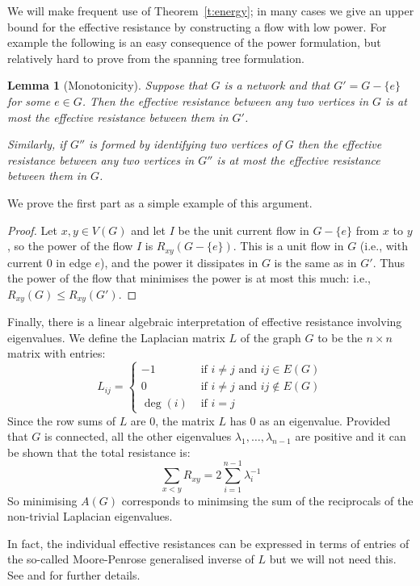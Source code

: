 \documentclass[11pt]{article}
\newtheorem{lemma}[theorem]{Lemma}
\theoremstyle{remark}
\begin{document}
We will make frequent use of Theorem~\ref{t:energy}; in many cases we
give an upper bound for the effective resistance by constructing a
flow with low power. For example the following is an easy consequence
of the power formulation, but relatively hard to prove from the
spanning tree formulation.

\begin{lemma}[Monotonicity]
  Suppose that $G$ is a network and that $G'=G-\{e\}$ for some $e\in
  G$. Then the effective resistance between any two vertices in $G$ is
  at most the effective resistance between them in $G'$.

  Similarly, if $G''$ is formed by identifying two vertices of $G$
  then the effective resistance between any two vertices in $G''$ is
  at most the effective resistance between them in $G$.
\end{lemma}
We prove the first part as a simple example of this argument.
\begin{proof}
  Let $x,y\in V(G)$ and let $I$ be the unit current flow in $G-\{e\}$
  from $x$ to $y$, so the power of the flow $I$ is $R_{xy}(G-\{e\})$.
  This is a unit flow in $G$ (i.e., with current 0 in edge $e$), and
  the power it dissipates in $G$ is the same as in $G'$. Thus the
  power of the flow that minimises the power is at most this much:
  i.e., $R_{xy}(G)\le R_{xy}(G')$.
\end{proof}

Finally, there is a linear algebraic interpretation of effective resistance involving eigenvalues. We define the Laplacian matrix $L$ of the graph $G$ to be the $n\times n$ matrix with entries:
\[
L_{ij}=\left\{\begin{array}{cl}
-1 & \text{ if $i\not=j$ and $ij\in E(G)$}\\
0 & \text{ if $i\not=j$ and $ij\not\in E(G)$}\\
\deg(i) & \text{ if $i=j$}
\end{array}\right.
\]
Since the row sums of $L$ are $0$, the matrix $L$ has $0$ as an eigenvalue. Provided that $G$ is connected, all the other eigenvalues $\lambda_1,\dots,\lambda_{n-1}$ are positive and it can be shown that
the total resistance is:
\[
\sum_{x<y} R_{xy}=2 \sum_{i=1}^{n-1} \lambda_{i}^{-1}
\]
So minimising $A(G)$ corresponds to minimsing the sum of the reciprocals of the non-trivial Laplacian eigenvalues.

In fact, the individual effective resistances can be expressed in terms of entries of the so-called Moore-Penrose generalised inverse of $L$ but we will not need this. See \cite{KleinRandic} and \cite{MR3026766} for further details.
\end{document}
